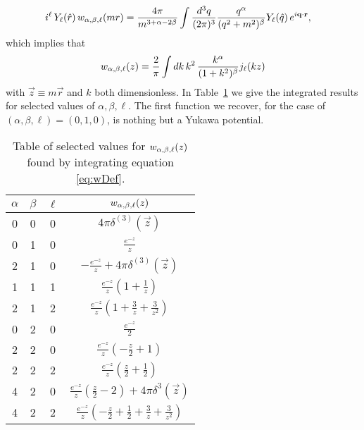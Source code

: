\begin{align}
i^\ell \, Y_\ell(\hat{r}) \, w_{\alpha,\beta,\ell}( m r)  &= \frac{4 \pi}{m^{3+\alpha-2\beta} }  \int \frac{d^3 q}{(2\pi)^3} \frac{q^\alpha}{(q^2+m^2)^\beta} Y_\ell(\hat{q}) \, e^{i \mathbf{q} \cdot \mathbf{r}  },
\end{align}
which implies that
\begin{align}\label{eq:wDef}
w_{\alpha,\beta,\ell}(z) =  \frac{2}{\pi} \int dk \, k^2 \, \frac{k^\alpha}{(1+k^2)^\beta} j_\ell(k z)
\end{align}
with $\vec{z} \equiv m \vec{r}$ and $k$ both dimensionless. In Table~\ref{table:wTable} we give the integrated results for selected values of $\alpha, \beta, \ell$. The first function we recover, for the case of $(\alpha, \beta, \ell ) = (0,1,0)$, is nothing but a Yukawa potential.

\begin{table}
\begin{center}
\begin{tabular}{| c c c | c |}
\hline
$\alpha$ & $\beta$ & $\ell$ & $ w_{\alpha,\beta,\ell}(z)$ \\
\hline
0 & 0 & 0 & $ 4\pi \delta^{(3)}(\vec{z}) $ \\
0 & 1 & 0 & $ \frac{\displaystyle e^{-z}}{\displaystyle z} $ \\
2 & 1 & 0 & $ -\frac{\displaystyle e^{-z}}{\displaystyle z} + 4\pi \delta^{(3)}(\vec{z}) $ \\
1 & 1 & 1 &  $\frac{\displaystyle e^{-z}}{\displaystyle z} (1 + \tfrac{1}{z})  $ \\
2 & 1 & 2 & $ \frac{\displaystyle e^{-z}}{\displaystyle z} (1+ \tfrac{3}{z} + \tfrac{3}{z^2} )$ \\
0 & 2 & 0 & $ \frac{\displaystyle e^{-z}}{2} $ \\
2 & 2 & 0 & $ \frac{\displaystyle e^{-z}}{\displaystyle z} (-\tfrac{z}{2} + 1 ) $ \\
2 & 2 & 2 & $  \frac{\displaystyle e^{-z}}{\displaystyle z} (\tfrac{z}{2} + \tfrac{1}{2} ) $ \\
4 & 2 & 0 & $  \frac{\displaystyle e^{-z}}{\displaystyle z} (\tfrac{z}{2} - 2 ) + 4 \pi \delta^3( \vec{z} )  $ \\
4 & 2 & 2 & $  \frac{\displaystyle e^{-z}}{\displaystyle z} ( - \tfrac{z}{2} + \tfrac{1}{2} + \tfrac{3}{z} + \tfrac{3}{z^2} ) $ \\
\hline
\end{tabular}
\end{center}
\caption{\label{table:wTable} Table of selected values for $w_{\alpha,\beta,\ell}(z)$ found by integrating equation \eqref{eq:wDef}.}
\end{table}

